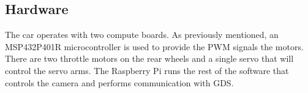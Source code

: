 \documentclass{article}
\begin{document}

\subsection{Hardware}

The car operates with two compute boards. As previously mentioned, an MSP432P401R microcontroller is used to provide the PWM signals the motors. There are two throttle motors on the rear wheels and a single servo that will control the servo arms. The Raspberry Pi runs the rest of the software that controls the camera and performs communication with GDS.
\end{document}
